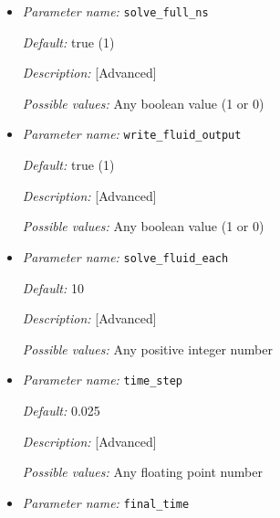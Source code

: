 \begin{itemize}

{\it Default:} false (0)

{\it Description:} [Standard] 

{\it Possible values:} Any boolean value (1 or 0)


\item {\it Parameter name:} {\tt solve\_full\_ns}
\label{parameters:solve_full_ns}


{\it Default:} true (1)

{\it Description:} [Advanced] 

{\it Possible values:} Any boolean value (1 or 0)


\item {\it Parameter name:} {\tt write\_fluid\_output}
\label{parameters:write_fluid_output}


{\it Default:} true (1)

{\it Description:} [Advanced] 

{\it Possible values:} Any boolean value (1 or 0)


\item {\it Parameter name:} {\tt solve\_fluid\_each}
\label{parameters:solve_fluid_each}


{\it Default:} 10

{\it Description:} [Advanced] 

{\it Possible values:} Any positive integer number


\item {\it Parameter name:} {\tt time\_step}
\label{parameters:time_step}


{\it Default:} 0.025

{\it Description:} [Advanced] 

{\it Possible values:} Any floating point number


\item {\it Parameter name:} {\tt final\_time}
\label{parameters:final_time}


\end{itemize}
